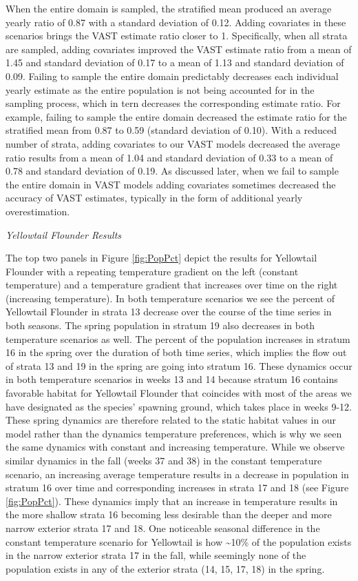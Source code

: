 \documentclass[
  12pt,
]{article}
\begin{document}
When the entire domain is sampled, the stratified mean produced an average yearly ratio of 0.87 with a standard deviation of 0.12. Adding covariates in these scenarios brings the VAST estimate ratio closer to 1. Specifically, when all strata are sampled, adding covariates improved the VAST estimate ratio from a mean of 1.45 and standard deviation of 0.17 to a mean of 1.13 and standard deviation of 0.09. Failing to sample the entire domain predictably decreases each individual yearly estimate as the entire population is not being accounted for in the sampling process, which in tern decreases the corresponding estimate ratio. For example, failing to sample the entire domain decreased the estimate ratio for the stratified mean from 0.87 to 0.59 (standard deviation of 0.10). With a reduced number of strata, adding covariates to our VAST models decreased the average ratio results from a mean of 1.04 and standard deviation of 0.33 to a mean of 0.78 and standard deviation of 0.19. As discussed later, when we fail to sample the entire domain in VAST models adding covariates sometimes decreased the accuracy of VAST estimates, typically in the form of additional yearly overestimation.

\emph{Yellowtail Flounder Results}

The top two panels in Figure \ref{fig:PopPct} depict the results for Yellowtail Flounder with a repeating temperature gradient on the left (constant temperature) and a temperature gradient that increases over time on the right (increasing temperature). In both temperature scenarios we see the percent of Yellowtail Flounder in strata 13 decrease over the course of the time series in both seasons. The spring population in stratum 19 also decreases in both temperature scenarios as well. The percent of the population increases in stratum 16 in the spring over the duration of both time series, which implies the flow out of strata 13 and 19 in the spring are going into stratum 16. These dynamics occur in both temperature scenarios in weeks 13 and 14 because stratum 16 contains favorable habitat for Yellowtail Flounder that coincides with most of the areas we have designated as the species' spawning ground, which takes place in weeks 9-12. These spring dynamics are therefore related to the static habitat values in our model rather than the dynamics temperature preferences, which is why we seen the same dynamics with constant and increasing temperature. While we observe similar dynamics in the fall (weeks 37 and 38) in the constant temperature scenario, an increasing average temperature results in a decrease in population in stratum 16 over time and corresponding increases in strata 17 and 18 (see Figure \ref{fig:PopPct}). These dynamics imply that an increase in temperature results in the more shallow strata 16 becoming less desirable than the deeper and more narrow exterior strata 17 and 18. One noticeable seasonal difference in the constant temperature scenario for Yellowtail is how \textasciitilde10\% of the population exists in the narrow exterior strata 17 in the fall, while seemingly none of the population exists in any of the exterior strata (14, 15, 17, 18) in the spring.
\end{document}
